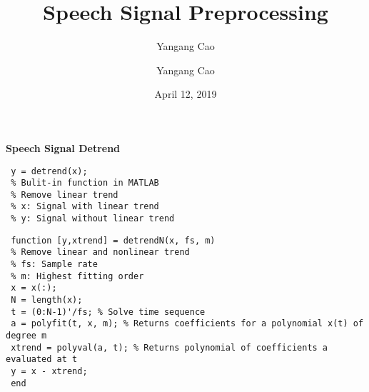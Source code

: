 \documentclass[10pt,a4paper,oneside]{beamer}
\author{Yangang Cao}
\author{Yangang Cao}
\title{Speech Signal Preprocessing}
\date{April 12, 2019}
\begin{document}
	
\frame[plain]{\titlepage}

\begin{frame}[fragile]
\vspace{0.5cm}
{\bfseries Speech Signal Detrend}
\vspace{0.1cm}
\begin{lstlisting}
 y = detrend(x);
 % Bulit-in function in MATLAB
 % Remove linear trend
 % x: Signal with linear trend
 % y: Signal without linear trend
 \end{lstlisting}

 \begin{lstlisting}
 function [y,xtrend] = detrendN(x, fs, m)
 % Remove linear and nonlinear trend
 % fs: Sample rate
 % m: Highest fitting order
 x = x(:); 
 N = length(x);
 t = (0:N-1)'/fs; % Solve time sequence
 a = polyfit(t, x, m); % Returns coefficients for a polynomial x(t) of degree m
 xtrend = polyval(a, t); % Returns polynomial of coefficients a evaluated at t
 y = x - xtrend;
 end
 \end{lstlisting}

\end{frame}

\begin{frame}
\vspace{0.5cm}

\end{frame}
\end{document}
